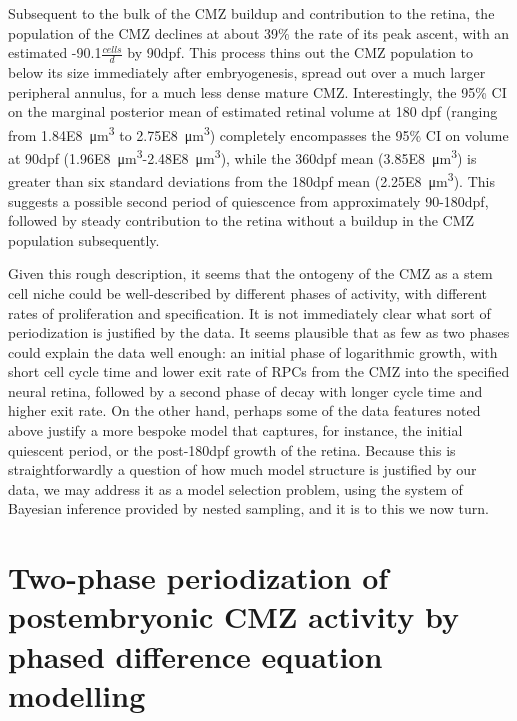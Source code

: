 Subsequent to the bulk of the CMZ buildup and contribution to the retina, the population of the CMZ declines at about 39\% the rate of its peak ascent, with an estimated -90.1$\frac{cells}{d}$ by 90dpf. This process thins out the CMZ population to below its size immediately after embryogenesis, spread out over a much larger peripheral annulus, for a much less dense mature CMZ. Interestingly, the 95\% CI on the marginal posterior mean of estimated retinal volume at 180 dpf (ranging from \SI{1.84E8}{\cubic\micro\metre} to \SI{2.75E8}{\cubic\micro\metre}) completely encompasses the 95\% CI on volume at 90dpf (\SI{1.96E8}{\cubic\micro\metre}-\SI{2.48E8}{\cubic\micro\metre}), while the 360dpf mean (\SI{3.85E8}{\cubic\micro\metre}) is greater than six standard deviations from the 180dpf mean (\SI{2.25E8}{\cubic\micro\metre}). This suggests a possible second period of quiescence from approximately 90-180dpf, followed by steady contribution to the retina without a buildup in the CMZ population subsequently.

Given this rough description, it seems that the ontogeny of the CMZ as a stem cell niche could be well-described by different phases of activity, with different rates of proliferation and specification. It is not immediately clear what sort of periodization is justified by the data. It seems plausible that as few as two phases could explain the data well enough: an initial phase of logarithmic growth, with short cell cycle time and lower exit rate of RPCs from the CMZ into the specified neural retina, followed by a second phase of decay with longer cycle time and higher exit rate. On the other hand, perhaps some of the data features noted above justify a more bespoke model that captures, for instance, the initial quiescent period, or the post-180dpf growth of the retina. Because this is straightforwardly a question of how much model structure is justified by our data, we may address it as a model selection problem, using the system of Bayesian inference provided by nested sampling, and it is to this we now turn.

\section{Two-phase periodization of postembryonic CMZ activity by phased difference equation modelling}

